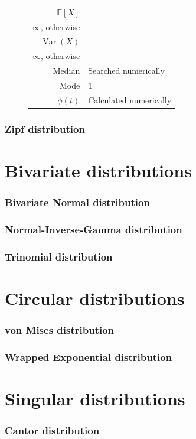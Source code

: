 \documentclass[a4paper,11pt]{article}
\theoremstyle{plain}
\theoremstyle{definition}
\newcommand{\ME}{\mathbb{E}}
\newcommand{\Var}{\operatorname{Var}}
\begin{document}
\begin{figure}[!htb]
\begin{minipage}{0.4\textwidth}
\begin{tabular}{| r | l |}
					\hline
					$\ME[X]$ & \pbox{\linewidth}{$ \frac{\zeta(s-1)}{\zeta(s)}$, $s > 2$ \\ $\infty$, otherwise } \\
					\hline
					$\Var(X)$ & \pbox{\linewidth}{$ \frac{\zeta(s-2)}{\zeta(s)} - (\ME[X])^2$, $\rho > 3$ \\ $\infty$, otherwise } \\
					\hline
					Median & Searched numerically \\
					\hline
					Mode & $1 $ \\
					\hline
					$\phi(t)$ & Calculated numerically \\
					\hline
				\end{tabular}
			\end{minipage}
		\end{figure}
		
	\pagebreak
	\section{Zipf distribution}
	
	\pagebreak
	\part{Bivariate distributions}
	\section{Bivariate Normal distribution}
	\section{Normal-Inverse-Gamma distribution}
	\section{Trinomial distribution}
	
	\pagebreak
	\part{Circular distributions}
	\section{von Mises distribution}
	\section{Wrapped Exponential distribution}
	
	\pagebreak
	\part{Singular distributions}
	\section{Cantor distribution}
	
\end{document}
